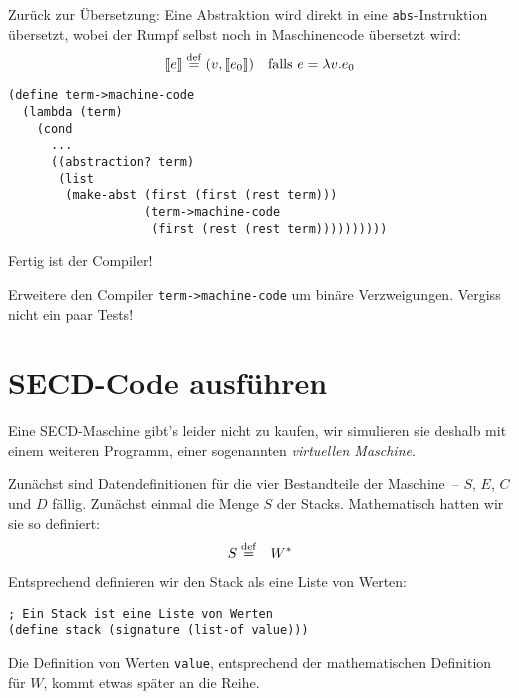 %
Zurück zur Übersetzung: Eine Abstraktion wird direkt in eine
\lstinline{abs}-Instruktion übersetzt, wobei der Rumpf selbst
noch in Maschinencode übersetzt wird:
\begin{displaymath}
  \llbracket e \rrbracket \stackrel{\rm def}{=}
    (v, \llbracket e_0\rrbracket) \quad \textrm{falls $e = \lambda v.e_0$}
\end{displaymath}
%
\begin{lstlisting}
(define term->machine-code
  (lambda (term)
    (cond
      ...
      ((abstraction? term)
       (list
        (make-abst (first (first (rest term)))
                   (term->machine-code
                    (first (rest (rest term))))))))))
\end{lstlisting}
%
Fertig ist der Compiler!
%
\begin{aufgabeinline}
  Erweitere den Compiler \lstinline{term->machine-code} um
  binäre Verzweigungen.  Vergiss nicht ein paar Tests!
\end{aufgabeinline}

\section{SECD-Code ausführen}
\label{sec:secd-transition}

Eine SECD-Maschine gibt's leider nicht zu kaufen, wir simulieren sie
deshalb mit einem weiteren Programm, einer sogenannten
\textit{virtuellen Maschine}.

Zunächst sind Datendefinitionen für die vier Bestandteile der
Maschine~-- $S$, $E$, $C$ und $D$ fällig.  Zunächst einmal die Menge
$S$ der Stacks.  Mathematisch hatten wir sie so definiert:
%
\begin{eqnarray*}
    S &\stackrel{\rm def}{=}& W^\ast
\end{eqnarray*}
%
Entsprechend definieren wir den Stack als eine Liste von Werten:
%
\begin{lstlisting}
; Ein Stack ist eine Liste von Werten
(define stack (signature (list-of value)))
\end{lstlisting}
%
Die Definition von Werten \lstinline{value}, entsprechend der
mathematischen Definition für $W$, kommt etwas später an die Reihe.

